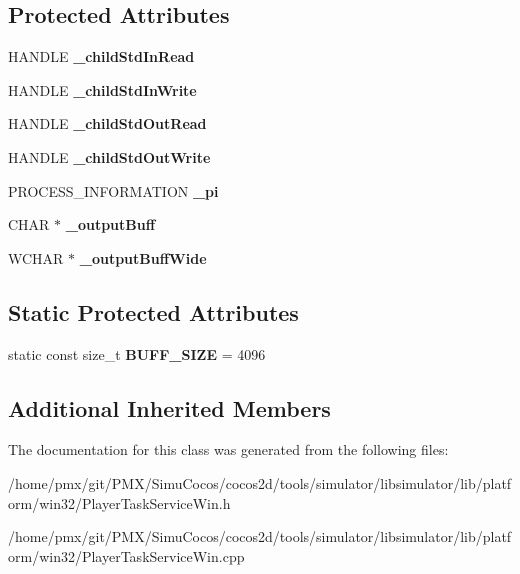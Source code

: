 \subsection*{Protected Attributes}
\begin{DoxyCompactItemize}
\item 
\mbox{\label{classPlayerTaskWin_a64498cf586933a2f73f75e9fefb1b7a7}} 
H\+A\+N\+D\+LE {\bfseries \+\_\+child\+Std\+In\+Read}
\item 
\mbox{\label{classPlayerTaskWin_ab10d6c2595bf6b104d5e3b27e542baf9}} 
H\+A\+N\+D\+LE {\bfseries \+\_\+child\+Std\+In\+Write}
\item 
\mbox{\label{classPlayerTaskWin_a9f1b9d1683ab6286e770b6165a487099}} 
H\+A\+N\+D\+LE {\bfseries \+\_\+child\+Std\+Out\+Read}
\item 
\mbox{\label{classPlayerTaskWin_a20193a8f29ca0e1a7a51b367cc7e087a}} 
H\+A\+N\+D\+LE {\bfseries \+\_\+child\+Std\+Out\+Write}
\item 
\mbox{\label{classPlayerTaskWin_a1159fe221adffae3ce4b799dd940812d}} 
P\+R\+O\+C\+E\+S\+S\+\_\+\+I\+N\+F\+O\+R\+M\+A\+T\+I\+ON {\bfseries \+\_\+pi}
\item 
\mbox{\label{classPlayerTaskWin_aca276b1416f68bd43f10bfe32f12467c}} 
C\+H\+AR $\ast$ {\bfseries \+\_\+output\+Buff}
\item 
\mbox{\label{classPlayerTaskWin_a51f3747ac5e05395a779f16271376a36}} 
W\+C\+H\+AR $\ast$ {\bfseries \+\_\+output\+Buff\+Wide}
\end{DoxyCompactItemize}
\subsection*{Static Protected Attributes}
\begin{DoxyCompactItemize}
\item 
\mbox{\label{classPlayerTaskWin_a1f3bc54ee6ea1139f766b50904f5c3ea}} 
static const size\+\_\+t {\bfseries B\+U\+F\+F\+\_\+\+S\+I\+ZE} = 4096
\end{DoxyCompactItemize}
\subsection*{Additional Inherited Members}


The documentation for this class was generated from the following files\+:\begin{DoxyCompactItemize}
\item 
/home/pmx/git/\+P\+M\+X/\+Simu\+Cocos/cocos2d/tools/simulator/libsimulator/lib/platform/win32/Player\+Task\+Service\+Win.\+h\item 
/home/pmx/git/\+P\+M\+X/\+Simu\+Cocos/cocos2d/tools/simulator/libsimulator/lib/platform/win32/Player\+Task\+Service\+Win.\+cpp\end{DoxyCompactItemize}
